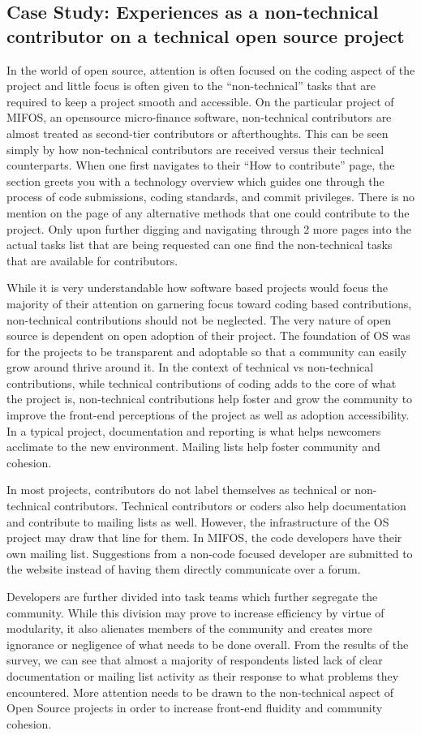\subsection{Case Study: Experiences as a non-technical contributor on a technical open source project}
 
In the world of open source, attention is often focused on the coding aspect of the project and little focus is often given to the “non-technical” tasks that are required to keep a project smooth and accessible. On the particular project of MIFOS, an opensource micro-finance software, non-technical contributors are almost treated as second-tier contributors or afterthoughts. This can be seen simply by how non-technical contributors are received versus their technical counterparts. When one first navigates to their “How to contribute” page, the section greets you with a technology overview which guides one through the process of code submissions, coding standards, and commit privileges. There is no mention on the page of any alternative methods that one could contribute to the project. Only upon further digging and navigating through 2 more pages into the actual tasks list that are being requested can one find the non-technical tasks that are available for contributors.

While it is very understandable how software based projects would focus the majority of their attention on garnering focus toward coding based contributions, non-technical contributions should not be neglected. The very nature of open source is dependent on open adoption of their project. The foundation of OS was for the projects to be transparent and adoptable so that a community can easily grow around thrive around it. In the context of technical vs non-technical contributions, while technical contributions of coding adds to the core of what the project is, non-technical contributions help foster and grow the community to improve the front-end perceptions of the project as well as adoption accessibility. In a typical project, documentation and reporting is what helps newcomers acclimate to the new environment. Mailing lists help foster community and cohesion.

In most projects, contributors do not label themselves as technical or non-technical contributors. Technical contributors or coders also help documentation and contribute to mailing lists as well.  However, the infrastructure of the OS project may draw that line for them. In MIFOS, the code developers have their own mailing list. Suggestions from a non-code focused developer are submitted to the website instead of having them directly communicate over a forum.  

Developers are further divided into task teams which further segregate the community. While this division may prove to increase efficiency by virtue of modularity, it also alienates members of the community and creates more ignorance or negligence of what needs to be done overall. From the results of the survey, we can see that almost a majority of respondents listed lack of clear documentation or mailing list activity as their response to what problems they encountered. More attention needs to be drawn to the non-technical aspect of Open Source projects in order to increase front-end fluidity and community cohesion.
